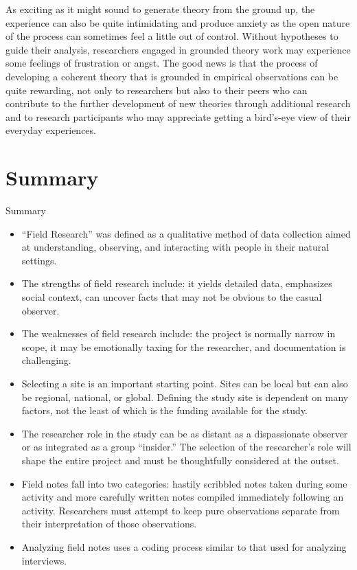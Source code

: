 As exciting as it might sound to generate theory from the ground up, the experience can also be quite intimidating and produce anxiety as the open nature of the process can sometimes feel a little out of control. Without hypotheses to guide their analysis, researchers engaged in grounded theory work may experience some feelings of frustration or angst. The good news is that the process of developing a coherent theory that is grounded in empirical observations can be quite rewarding, not only to researchers but also to their peers who can contribute to the further development of new theories through additional research and to research participants who may appreciate getting a bird’s-eye view of their everyday experiences.

\section{Summary}\label{ch11:summary}

\begin{center}
	\begin{tkawybox}{Summary}
		\begin{itemize}
			\item ``Field Research'' was defined as a qualitative method of data collection aimed at understanding, observing, and interacting with people in their natural settings.
			\item The strengths of field research include: it yields detailed data, emphasizes social context, can uncover facts that may not be obvious to the casual observer.
			\item The weaknesses of field research include: the project is normally narrow in scope, it may be emotionally taxing for the researcher, and documentation is challenging.
			\item Selecting a site is an important starting point. Sites can be local but can also be regional, national, or global. Defining the study site is dependent on many factors, not the least of which is the funding available for the study.
			\item The researcher role in the study can be as distant as a dispassionate observer or as integrated as a group ``insider.'' The selection of the researcher's role will shape the entire project and must be thoughtfully considered at the outset.
			\item Field notes fall into two categories: hastily scribbled notes taken during some activity and more carefully written notes compiled immediately following an activity. Researchers must attempt to keep pure observations separate from their interpretation of those observations.
			\item Analyzing field notes uses a coding process similar to that used for analyzing interviews.
		\end{itemize}
	\end{tkawybox}
\end{center}
